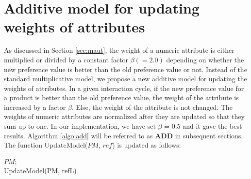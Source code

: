 \section{Additive model for updating weights of attributes}
\label{sec:additive}

As discussed in Section \ref{sec:maut}, the weight of a numeric attribute is either multiplied or divided by a constant factor $\beta (=2.0)$ depending on whether the new preference value is better than the old preference value or not.
Instead of the standard multiplicative model, we propose a new additive model for updating the weights of attributes.
In a given interaction cycle, if the new preference value for a product is better than the old preference value, the weight of the attribute is increased by a factor $\beta$.
Else, the weight of the attribute is not changed.
The weights of numeric attributes are normalized after they are updated so that they sum up to one. 
In our implementation, we have set $\beta$ = 0.5 and it gave the best results.
Algorithm \ref{algo:add} will be referred to as \textbf{ADD} in subsequent sections.
The function UpdateModel($PM$, $ref$) is updated as follows:

\begin{algorithm}[ht]
  \DontPrintSemicolon

  \Return $PM$;\\

  \caption{UpdateModel(PM, refL)}
  \label{algo:add}
\end{algorithm}
